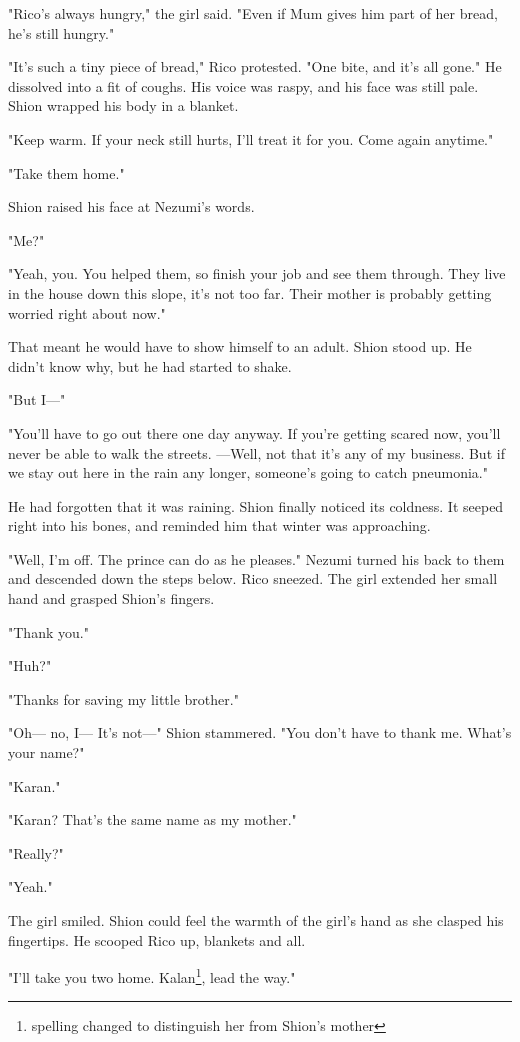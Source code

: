 "Rico's always hungry," the girl said. "Even if Mum gives him part of
her bread, he's still hungry."

"It's such a tiny piece of bread," Rico protested. "One bite, and it's
all gone." He dissolved into a fit of coughs. His voice was raspy, and
his face was still pale. Shion wrapped his body in a blanket.

"Keep warm. If your neck still hurts, I'll treat it for you. Come again
anytime."

"Take them home."

Shion raised his face at Nezumi's words.

"Me?"

"Yeah, you. You helped them, so finish your job and see them through.
They live in the house down this slope, it's not too far. Their mother
is probably getting worried right about now."

That meant he would have to show himself to an adult. Shion stood up. He
didn't know why, but he had started to shake.

"But I---"

"You'll have to go out there one day anyway. If you're getting scared
now, you'll never be able to walk the streets. ---Well, not that it's any
of my business. But if we stay out here in the rain any longer,
someone's going to catch pneumonia."

He had forgotten that it was raining. Shion finally noticed its
coldness. It seeped right into his bones, and reminded him that winter
was approaching.

"Well, I'm off. The prince can do as he pleases." Nezumi turned his back
to them and descended down the steps below. Rico sneezed. The girl
extended her small hand and grasped Shion's fingers.

"Thank you."

"Huh?"

"Thanks for saving my little brother."

"Oh--- no, I--- It's not---" Shion stammered. "You don't have to thank me.
What's your name?"

"Karan."

"Karan? That's the same name as my mother."

"Really?"

"Yeah."

The girl smiled. Shion could feel the warmth of the girl's hand as she
clasped his fingertips. He scooped Rico up, blankets and all.

"I'll take you two home. Kalan\footnote{spelling changed to distinguish her from Shion's mother}, lead the way."

